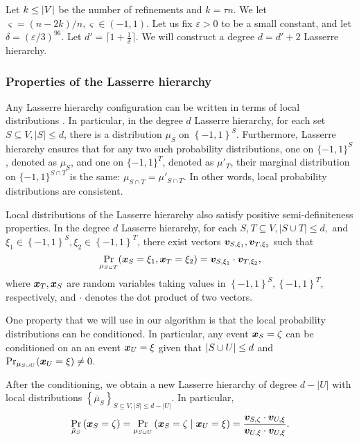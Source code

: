 Let $k \leq \lvert V\rvert$ be the number of refinements and $k = \tau n$.
We let $\varsigma=(n-2k)/n, \varsigma\in (-1,1)$. 
Let us fix $\varepsilon>0$ to be a small constant, and let $\delta=(\varepsilon/3)^{96}$. 
Let $d'= \lceil 1+ \frac{1}{\delta} \rceil $. We will construct a degree $d=d'+2$ Lasserre hierarchy. 

\subsubsection{Properties of the Lasserre hierarchy} 
\label{subsection:lassere_hierarchy_properties}
Any Lasserre hierarchy configuration can be written in terms of local
distributions \citep{DBLP:journals/siamjo/Lasserre02}. In particular, in the
degree $d$ Lasserre hierarchy, for each set $S \subseteq V, |S| \leq d$, there
is a distribution $\mu_S$ on $\left \{-1,1\right\}^S$. Furthermore, Lasserre
hierarchy ensures that for any two such
probability distributions, one on $\{-1, 1\}^S$, denoted as $\mu_S$, and one on
$\{-1, 1\}^T$, denoted as $\mu'_T$, their marginal distribution on $\{-1, 1\}^{S \cap T}$ is the same: $\mu_{S \cap T} = \mu'_{S \cap T}$. 
In other words, local probability distributions are consistent. 

Local distributions of the Lasserre hierarchy also satisfy positive semi-definiteness properties.
In the degree $d$ Lasserre hierarchy, for each $S, T \subseteq V, |S \cup T| \leq d,$ and $\xi_1 \in \left \{-1,1\right\}^S,\xi_2 \in \left \{-1,1\right\}^T$, there exist vectors $\bm{v}_{S,\xi_1},\bm{v}_{T,\xi_2}$ such that 
\begin{equation*}
\Pr_{\mu_{S \cup T}} (\bm{x}_S = \xi_1, \bm{x}_T = \xi_2) =  \bm{v}_{S,\xi_1} \cdot \bm{v}_{T,\xi_2}, 
\end{equation*}
where $\bm{x}_T,\bm{x}_S$ are random variables taking values in $\left
\{-1,1\right\}^S, \left \{-1,1\right\}^T$, respectively, and $\cdot$ denotes the
dot product of two vectors. 

One property that we will use in our algorithm is that the local probability distributions can be conditioned.
In particular, any event $\bm{x}_S = \zeta$
can be conditioned on an 
an event $\bm{x}_U = \xi$ given that $\lvert S \cup U\rvert \leq d$ and $\Pr_{\mu_{S \cup U}}(\bm{x}_U = \xi) \neq 0$. 

After the conditioning, we obtain a new 
Lasserre hierarchy of degree $d-|U|$ with local distributions $\left \{\bar{\mu}_S\right\}_{S \subseteq V,|S| \leq d-|U|}$.
In particular, 
\begin{equation*}
\begin{split}
	\Pr_{\bar{\mu}_{S}}\left( \bm{x}_S = \zeta \right) 
 = \Pr_{\mu_{S \cup U }}  \left( \bm{x}_S = \zeta \mid \bm{x}_U = \xi\right)
 = \frac{\bm{v}_{S, \zeta} \cdot \bm{v}_{U, \xi}}{\bm{v}_{U, \xi} \cdot \bm{v}_{U, \xi}}.
\end{split}
\end{equation*}


